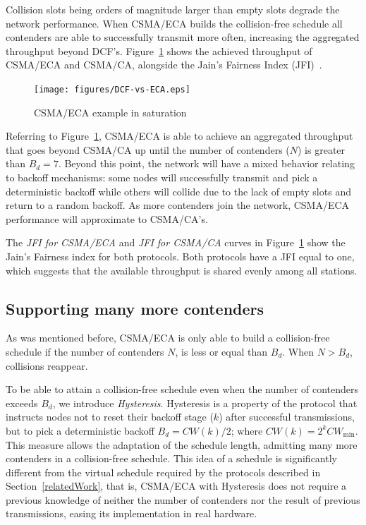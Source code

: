 \documentclass[a4paper,journal]{IEEEtran}
\begin{document}
Collision slots being orders of magnitude larger than empty slots degrade the network performance. When CSMA/ECA builds the collision-free schedule all contenders are able to successfully transmit more often, increasing the aggregated throughput beyond DCF's. Figure~\ref{fig:BECA} shows the achieved throughput of CSMA/ECA and CSMA/CA, alongside the Jain's Fairness Index (JFI)~\cite{JFI}.

\begin{figure}[tb]
\centering
  \texttt{[image: figures/DCF-vs-ECA.eps]}
  \caption{CSMA/ECA example in saturation}
  \label{fig:BECA}
\end{figure}

Referring to Figure~\ref{fig:BECA}, CSMA/ECA is able to achieve an aggregated throughput that goes beyond CSMA/CA up until the number of contenders ($N$) is greater than $B_{d}=7$. Beyond this point, the network will have a mixed behavior relating to backoff mechanisms: some nodes will successfully transmit and pick a deterministic backoff while others will collide due to the lack of empty slots and return to a random backoff. As more contenders join the network, CSMA/ECA performance will approximate to CSMA/CA's.

The \emph{JFI for CSMA/ECA} and \emph{JFI for CSMA/CA} curves in Figure~\ref{fig:BECA} show the Jain's Fairness index for both protocols. Both protocols have a JFI equal to one, which suggests that the available throughput is shared evenly among all stations.

	\subsection{Supporting many more contenders}\label{moreContenders}
	As was mentioned before, CSMA/ECA is only able to build a collision-free schedule if the number of contenders $N$, is less or equal than $B_{d}$. When $N > B_{d}$, collisions reappear. 
	
	To be able to attain a collision-free schedule even when the number of contenders exceeds $B_{d}$, we introduce \emph{Hysteresis}. Hysteresis is a property of the protocol that instructs nodes not to reset their backoff stage ($k$) after successful transmissions, but to pick a deterministic backoff $B_{d}=CW(k)/2$; where $CW(k)=2^{k}CW_{\min}$. This measure allows the adaptation of the schedule length, admitting many more contenders in a collision-free schedule. This idea of a schedule is significantly different from the virtual schedule required by the protocols described in Section~\ref{relatedWork}, that is, CSMA/ECA with Hysteresis does not require a previous knowledge of neither the number of contenders nor the result of previous transmissions, easing its implementation in real hardware.
	
\end{document}
